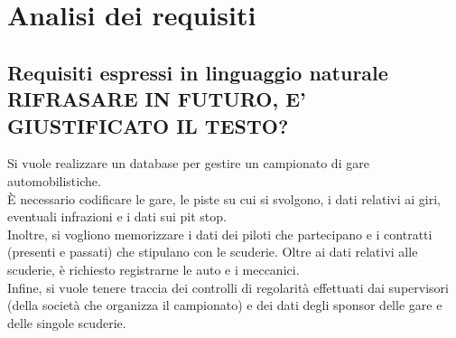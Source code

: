 \documentclass[11pt]{article}
\begin{document}
\tableofcontents
\newpage


\section{Analisi dei requisiti}
\subsection{Requisiti espressi in linguaggio naturale \textbf{RIFRASARE IN FUTURO, E' GIUSTIFICATO IL TESTO?}}
Si vuole realizzare un database per gestire un campionato di gare automobilistiche. \\
È necessario codificare le gare, le piste su cui si svolgono, i dati relativi ai giri, eventuali infrazioni e i dati sui pit stop. \\
Inoltre, si vogliono memorizzare i dati dei piloti che partecipano e i contratti (presenti e passati) che stipulano con le scuderie. Oltre ai dati relativi alle scuderie, è richiesto registrarne le auto e i meccanici. \\
Infine, si vuole tenere traccia dei controlli di regolarità effettuati dai supervisori (della società che organizza il campionato) e dei dati degli sponsor delle gare e delle singole scuderie. \\[1em]
\end{document}
